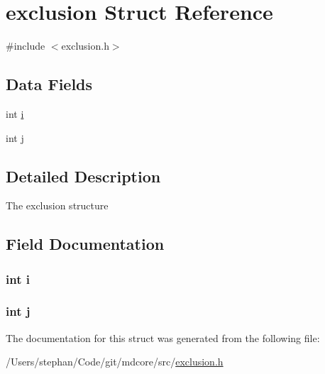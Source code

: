 \hypertarget{structexclusion}{\section{exclusion Struct Reference}
\label{structexclusion}
}


{\ttfamily \#include $<$exclusion.\-h$>$}

\subsection*{Data Fields}
\begin{DoxyCompactItemize}
\item 
int \hyperlink{structexclusion_acb559820d9ca11295b4500f179ef6392}{i}
\item 
int \hyperlink{structexclusion_a37d972ae0b47b9099e30983131d31916}{j}
\end{DoxyCompactItemize}


\subsection{Detailed Description}
The exclusion structure 

\subsection{Field Documentation}
\hypertarget{structexclusion_acb559820d9ca11295b4500f179ef6392}{
\subsubsection[{i}]{\setlength{\rightskip}{0pt plus 5cm}int i}}\label{structexclusion_acb559820d9ca11295b4500f179ef6392}
\hypertarget{structexclusion_a37d972ae0b47b9099e30983131d31916}{
\subsubsection[{j}]{\setlength{\rightskip}{0pt plus 5cm}int j}}\label{structexclusion_a37d972ae0b47b9099e30983131d31916}


The documentation for this struct was generated from the following file\-:\begin{DoxyCompactItemize}
\item 
/\-Users/stephan/\-Code/git/mdcore/src/\hyperlink{exclusion_8h}{exclusion.\-h}\end{DoxyCompactItemize}

